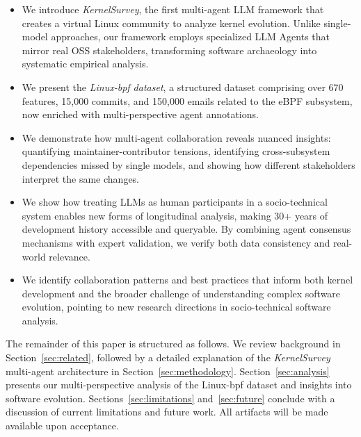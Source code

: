 \documentclass[sigconf,review,anonymous]{acmart}
\newcommand{\sys}{\textit{KernelSurvey}\xspace}
\begin{document}
\begin{itemize}
    \item We introduce \sys, the first multi-agent LLM framework that creates a virtual Linux community to analyze kernel evolution. Unlike single-model approaches, our framework employs specialized LLM Agents that mirror real OSS stakeholders, transforming software archaeology into systematic empirical analysis.
    \item We present the \textit{Linux-bpf dataset}, a structured dataset comprising over 670 features, 15,000 commits, and 150,000 emails related to the eBPF subsystem, now enriched with multi-perspective agent annotations.
    \item We demonstrate how multi-agent collaboration reveals nuanced insights: quantifying maintainer-contributor tensions, identifying cross-subsystem dependencies missed by single models, and showing how different stakeholders interpret the same changes.
    \item We show how treating LLMs as human participants in a socio-technical system enables new forms of longitudinal analysis, making 30+ years of development history accessible and queryable. By combining agent consensus mechanisms with expert validation, we verify both data consistency and real-world relevance.
    \item We identify collaboration patterns and best practices that inform both kernel development and the broader challenge of understanding complex software evolution, pointing to new research directions in socio-technical software analysis.
\end{itemize}

The remainder of this paper is structured as follows. We review background in Section~\ref{sec:related}, followed by a detailed explanation of the \sys multi-agent architecture in Section~\ref{sec:methodology}. Section~\ref{sec:analysis} presents our multi-perspective analysis of the Linux-bpf dataset and insights into software evolution. Sections~\ref{sec:limitations} and~\ref{sec:future} conclude with a discussion of current limitations and future work. All artifacts will be made available upon acceptance.
\end{document}

